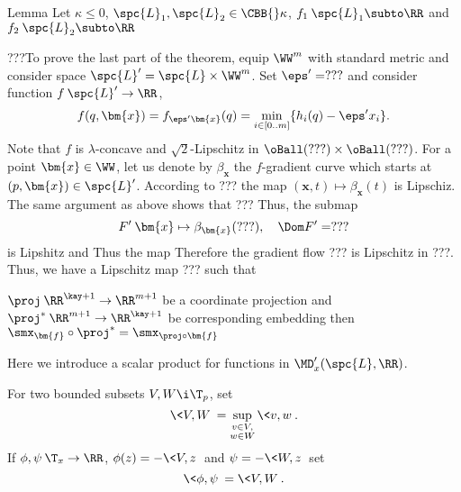 \begin{thm}{Lemma}
Let $\kappa\le 0$,
$\spc{L}_1, \spc{L}_2\in\CBB{}\kappa$, 
$f_1\:\spc{L}_1\subto\RR$ and  $f_2\:\spc{L}_2\subto\RR$ 
\end{thm}
















\smallskip

???To prove the last part of the theorem, equip $\WW^m$ with standard metric and consider space $\spc{L}'=\spc{L}\times \WW^m$.
Set $\eps'=???$ and consider function $f\:\spc{L}'\to\RR$, 
$$f(q,\bm{x})=f_{\eps'\bm{x}}(q)=\min_{i\in[0..m]}\{h_i(q)-\eps' x_i\}.$$ 
Note that $f$ is $\lambda$-concave and $\sqrt{2}$-Lipschitz in $\oBall(???)\times \oBall(???)$.
For a point $\bm{x}\in\WW$, let us denote by $\beta_{\bm{x}}$ the $f$-gradient curve which starts at $(p,\bm{x})\in \spc{L}'$.
According to ??? the map $(\bm{x},t)\mapsto \beta_{\bm{x}}(t)$ is Lipschiz.
The same argument as above shows that ???
Thus, the submap 
$$F'\:\bm{x}\mapsto \beta_{\bm{x}}(???),\ \ \ \Dom F'=???$$
is Lipshitz and 
Thus the map
Therefore the gradient flow ??? is Lipschitz in ???.
Thus, we have a Lipschitz map ??? such that 
















$\proj\:\RR^{\kay+1}\to \RR^{m+1}$ be a coordinate projection and $\proj^*\:\RR^{m+1}\to \RR^{\kay+1}$ be corresponding embedding then
$\smx_{\bm{f}}\circ\proj^*=\smx_{\proj\circ\bm{f}}$
















Here we introduce a scalar product for functions in $\MD_x'(\spc{L},\RR)$.

For two bounded subsets $V, W\i \T_p$, 
set 
$$\<V,W\>=\sup_{\substack{v\in V,\\ w\in W}}\<v,w\>.$$
If $\phi,\psi\:\T_x\to\RR$, 
$\phi(z)=-\<V,z\>$ 
and $\psi=-\<W,z\>$ 
set
$$\<\phi,\psi\>=\<V,W\>.$$


